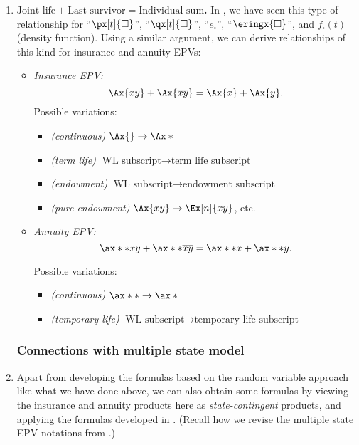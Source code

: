\begin{enumerate}
\item \label{it:jl-ls-epv-sum} \textbf{\(\text{Joint-life}+\text{Last-survivor}=\text{Individual sum}\).} 
In , we have seen this type of relationship
for ``\(\px[t]{\square}\)'', ``\(\qx[t]{\square}\)'', ``\(e_{\square}\)'',
``\(\eringx{\square}\)'', and \(f_{\square}(t)\) (density function).  Using a
similar argument, we can derive relationships of this kind for insurance and
annuity EPVs:
\begin{itemize}
\item \emph{Insurance EPV:}
\[
\Ax{xy}+\Ax{\overline{xy}}=\Ax{x}+\Ax{y}.
\]
Possible variations:
\begin{itemize}
\item \emph{(continuous)} \(\Ax{}\to\Ax*{}\)
\item \emph{(term life)} \(\text{WL subscript}\to\text{term life subscript}\)
\item \emph{(endowment)} \(\text{WL subscript}\to\text{endowment subscript}\)
\item \emph{(pure endowment)} \(\Ax{xy}\to\Ex[n]{xy}\), etc.
\end{itemize}
\item \emph{Annuity EPV:}
\[
\ax**{xy}+\ax**{\overline{xy}}=\ax**{x}+\ax**{y}.
\]

Possible variations:
\begin{itemize}
\item \emph{(continuous)} \(\ax**{}\to\ax*{}\)
\item \emph{(temporary life)} \(\text{WL subscript}\to\text{temporary life subscript}\)
\end{itemize}
\end{itemize}

\subsubsection*{Connections with multiple state model}
\item Apart from developing the formulas based on the random variable approach
like what we have done above, we can also obtain some formulas by viewing the
insurance and annuity products here as \emph{state-contingent} products, and
applying the formulas developed in .
(Recall how we revise the multiple state EPV notations from
.)


\end{enumerate}
